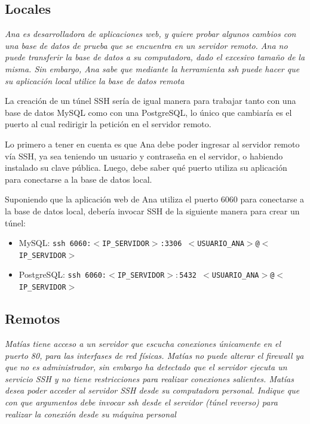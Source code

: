 \subsection{Locales}

\emph{Ana es desarrolladora de aplicaciones web, y quiere probar algunos cambios con una base de datos de prueba que se encuentra en un servidor remoto. Ana no puede transferir la base de datos a su computadora, dado el excesivo tamaño de la misma. Sin embargo, Ana sabe que mediante la herramienta ssh puede hacer que su aplicación local utilice la base de datos remota} 
\vspace*{5mm}

La creación de un túnel SSH sería de igual manera para trabajar tanto con una base de datos MySQL como con una PostgreSQL, lo único que cambiaría es el puerto al cual redirigir la petición en el servidor remoto.

Lo primero a tener en cuenta es que Ana debe poder ingresar al servidor remoto vía SSH, ya sea teniendo un usuario y contraseña en el servidor, o habiendo instalado su clave pública. Luego, debe saber qué puerto utiliza su aplicación para conectarse a la base de datos local.

Suponiendo que la aplicación web de Ana utiliza el puerto 6060 para conectarse a la base de datos local, debería invocar SSH de la siguiente manera para crear un túnel:

\begin{itemize}
    \item MySQL: \texttt{ssh 6060:$<$IP\_SERVIDOR$>$:3306 $<$USUARIO\_ANA$>$@$<$IP\_SERVIDOR$>$} 
    \item PostgreSQL: \texttt{ssh 6060:$<$IP\_SERVIDOR$>:$5432 $<$USUARIO\_ANA$>$@$<$IP\_SERVIDOR$>$} 
\end{itemize}

\subsection{Remotos}

\emph{Matías tiene acceso a un servidor que escucha conexiones únicamente en el puerto 80, para las interfases de red físicas. Matías no puede alterar el firewall ya que no es administrador, sin embargo ha detectado que el servidor ejecuta un servicio SSH y no tiene restricciones para realizar conexiones salientes. Matías desea poder acceder al servidor SSH desde su computadora personal. Indique que con que argumentos debe invocar ssh desde el servidor (túnel reverso) para realizar la conexión desde su máquina personal} 
\vspace*{5mm}

